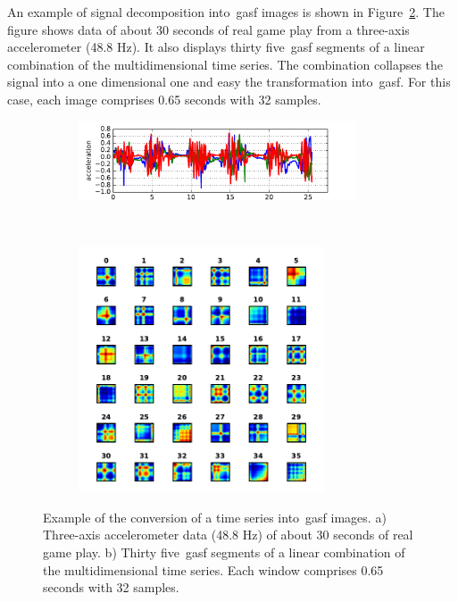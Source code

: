 An example of signal decomposition into~\gls{gasf} images is shown in Figure~\ref{fig:acc_signal_gasfs}. The figure shows data of about 30 seconds of real game play from a three-axis accelerometer (48.8 Hz). It also displays thirty five~\gls{gasf} segments of a linear combination of the multidimensional time series. The combination collapses the signal into a one dimensional one and easy the transformation into~\gls{gasf}. For this case, each image comprises 0.65 seconds with 32 samples.

\begin{figure}[H]
    \centering
    \begin{subfigure}[h]{\textwidth}
        \centering
        \includegraphics[width=0.9\textwidth]{images/05-modeling/example_signal}
        \label{figure:accelerometer_signal}
        \caption{}
    \end{subfigure} \vspace{-6pt}
    ~
    \begin{subfigure}[h]{0.8\textwidth}
        \centering
        \includegraphics[width=0.8\textwidth]{images/05-modeling/example_gafs_seg}
        \caption{}
    \end{subfigure} \vspace{-6pt}
    \caption{Example of the conversion of a time series into~\gls{gasf} images. a) Three-axis accelerometer data (48.8 Hz) of about 30 seconds of real game play. b) Thirty five~\gls{gasf} segments of a linear combination of the multidimensional time series. Each window comprises 0.65 seconds with 32 samples.}
    \label{fig:acc_signal_gasfs}
\end{figure}

